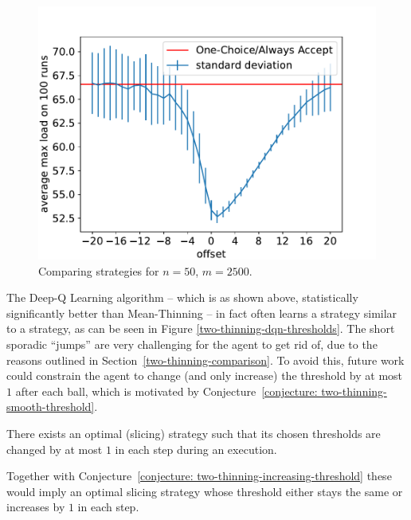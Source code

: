 \begin{figure}[h]
    \centering
    \includegraphics[scale=0.6]{Chapter4/Figs/offset_analysis_50_2500.pdf}
    \caption{Comparing \ConstantOffset strategies for $n=50$, $m=2500$.}
    \label{two-thinning-constant-offset}
\end{figure}



The Deep-Q Learning algorithm -- which is as shown above, statistically significantly better than Mean-Thinning -- in fact often learns a strategy similar to a \ConstantOffset strategy, as can be seen in Figure \ref{two-thinning-dqn-thresholds}. The short sporadic ``jumps'' are very challenging for the agent to get rid of, due to the reasons outlined in Section~\ref{two-thinning-comparison}. To avoid this, future work could constrain the agent to change (and only increase) the threshold by at most $1$ after each ball, which is motivated by Conjecture~\ref{conjecture: two-thinning-smooth-threshold}.


\begin{conjecture}\label{conjecture: two-thinning-smooth-threshold}
There exists an optimal (slicing) strategy such that its chosen thresholds are changed by at most $1$ in each step during an execution.
\end{conjecture}


\begin{remark}
Together with Conjecture~\ref{conjecture: two-thinning-increasing-threshold} these would imply an optimal slicing strategy whose threshold either stays the same or increases by $1$ in each step.
\end{remark}


